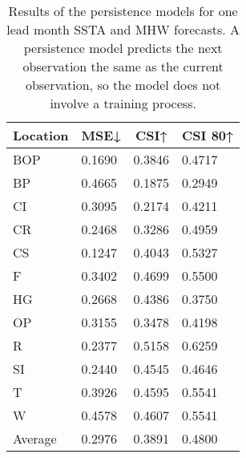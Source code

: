 \documentclass[11pt, a4paper]{article}
\begin{document}
\begin{table}[H]
\centering
\small
\caption{Results of the persistence models for one lead month SSTA and MHW forecasts. A persistence model predicts the next observation the same as the current observation, so the model does not involve a training process.}\label{tb:persist}
\begin{tabular}{llll}
\multicolumn{1}{c}{\textbf{Location}} & \multicolumn{1}{c}{\textbf{MSE↓}} & \multicolumn{1}{c}{\textbf{CSI↑}} & \multicolumn{1}{c}{\textbf{CSI 80↑}} \\ \hline
BOP                         & 0.1690                            & 0.3846                            & 0.4717                               \\
BP                        & 0.4665                            & 0.1875                            & 0.2949                               \\
CI                        & 0.3095                            & 0.2174                            & 0.4211                               \\
CR                           & 0.2468                            & 0.3286                            & 0.4959                               \\
CS                           & 0.1247                            & 0.4043                            & 0.5327                               \\
F                             & 0.3402                            & 0.4699                            & 0.5500                               \\
HG                          & 0.2668                            & 0.4386                            & 0.3750                               \\
OP                       & 0.3155                            & 0.3478                            & 0.4198                               \\
R                                & 0.2377                            & 0.5158                            & 0.6259                               \\
SI                        & 0.2440                            & 0.4545                            & 0.4646                               \\
T                              & 0.3926                            & 0.4595                            & 0.5541                               \\
W                             & 0.4578                            & 0.4607                            & 0.5541                               \\ \hline
Average                               & 0.2976                            & 0.3891                            & 0.4800
\end{tabular}
\end{table}
\end{document}
